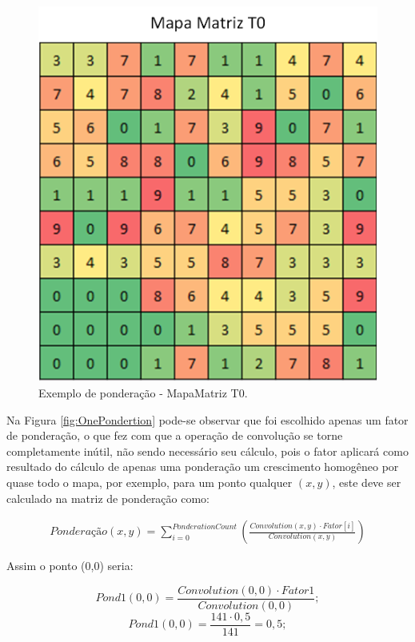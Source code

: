\begin{figure}[h]
	\centering	\includegraphics[scale=0.6]{Figuras/PonderationsExample-MatrixMap.png}
	\caption{Exemplo de ponderação - MapaMatriz T0.}
	\label{fig:MapaMatrizT0}
\end{figure}

Na Figura \ref{fig:OnePondertion} pode-se observar que foi escolhido apenas um fator de ponderação, o que fez com que a operação de convolução se torne completamente inútil, não sendo necessário seu cálculo, pois o fator aplicará como resultado do cálculo de apenas uma ponderação um crescimento homogêneo por quase todo o mapa, por exemplo, para um ponto qualquer \((x,y)\), este deve ser calculado na matriz de ponderação como:

\begin{equation}
\label{eq:ponderation1}
\begin{split}
Ponderação(x,y) = \sum_{i=0}^{PonderationCount} \left(\frac{Convolution(x,y) \cdot Fator[i]}{Convolution(x,y)}\right)
\end{split}
\end{equation}

Assim o ponto (0,0) seria:

\[Pond1(0,0) = \frac{Convolution(0,0) \cdot Fator1}{ Convolution(0,0)};\]
\[Pond1(0,0) = \frac{141 \cdot 0,5}{ 141 } = 0,5;\]


